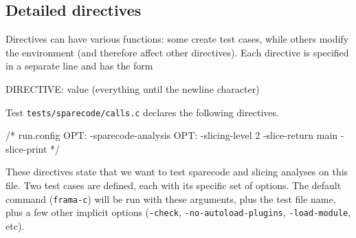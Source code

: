 \subsection{Detailed directives}\label{ptests:directives}

Directives can have various functions: some create test cases, while others
modify the environment (and therefore affect other directives).
Each directive is specified in a separate line and has the form
\begin{listing-nonumber}
DIRECTIVE: value (everything until the newline character)
\end{listing-nonumber}

\begin{example}
  Test \texttt{tests/sparecode/calls.c} declares the following directives.
\begin{listing-nonumber}
/* run.config
   OPT: -sparecode-analysis
   OPT: -slicing-level 2 -slice-return main -slice-print
*/
\end{listing-nonumber}
These directives state that we want to test sparecode and slicing analyses on
this file. Two test cases are defined, each with its specific set of options.
The default command (\texttt{frama-c}) will be run with these arguments, plus
the test file name, plus a few other implicit options (\verb|-check|,
\verb|-no-autoload-plugins|, \verb|-load-module|, etc).
\end{example}


